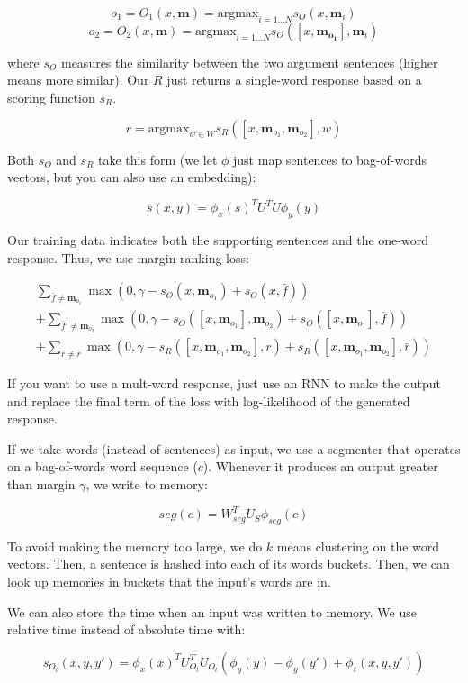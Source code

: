 \documentclass[a4paper]{article}
\begin{document}
$$
o_1 = O_1(x, \mathbf{m}) = \text{argmax}_{i = 1...N}{s_O(x, \mathbf{m}_i)}
$$
$$
o_2 = O_2(x, \mathbf{m}) = \text{argmax}_{i = 1...N}{s_O([x, \mathbf{m_{o_1}}],
\mathbf{m}_i)}
$$

where $s_O$ measures the similarity between the two argument sentences (higher
means more similar). Our $R$ just returns a single-word response based on
a scoring function $s_R$.

$$
r = \text{argmax}_{w \in W}{s_R([x, \mathbf{m}_{o_1}, \mathbf{m}_{o_2}], w)}
$$

Both $s_O$ and $s_R$ take this form (we let $\phi$ just map sentences to
bag-of-words vectors, but you can also use an embedding):

$$
s(x, y) = \phi_x(s)^T U^T U \phi_y(y)
$$

Our training data indicates both the supporting sentences and the one-word
response. Thus, we use margin ranking loss:

\begin{multline}
  \sum_{\bar{f} \ne \mathbf{m}_{o_1}}{
  \max{(0, \gamma - s_O(x, \mathbf{m}_{o_1}) + s_O(x, \bar{f}))}
  } \\ + \sum_{\bar{f}' \ne \mathbf{m}_{o_2}}{
  \max{(0, \gamma - s_O([x, \mathbf{m}_{o_1}], \mathbf{m}_{o_2}) +
  s_O([x, \mathbf{m}_{o_1}], \bar{f}))}
  } \\ +
  \sum_{\bar{r} \ne r}{
  \max{(0, \gamma - s_R([x, \mathbf{m}_{o_1}, \mathbf{m}_{o_2}],
  r) +
  s_R([x, \mathbf{m}_{o_1}, \mathbf{m}_{o_2}], \bar{r}))}
  }
\end{multline}

If you want to use a mult-word response, just use an RNN to make the output
and replace the final term of the loss with log-likelihood of the generated
response.

If we take words (instead of sentences) as input, we use a segmenter that
operates on a bag-of-words word sequence ($c$). Whenever it produces an output
greater than margin $\gamma$, we write to memory:

$$
seg(c) = W_{seg}^T U_S \phi_{seg}(c)
$$

To avoid making the memory too large, we do $k$ means clustering on the word
vectors. Then, a sentence is hashed into each of its words buckets. Then,
we can look up memories in buckets that the input's words are in.

We can also store the time when an input was written to memory. We use
relative time instead of absolute time with:

$$
s_{O_t}(x, y, y') = \phi_x(x)^T U_{O_t}^T U_{O_t} (\phi_y(y) - \phi_y(y')
+ \phi_t(x, y, y')
)
$$
\end{document}

